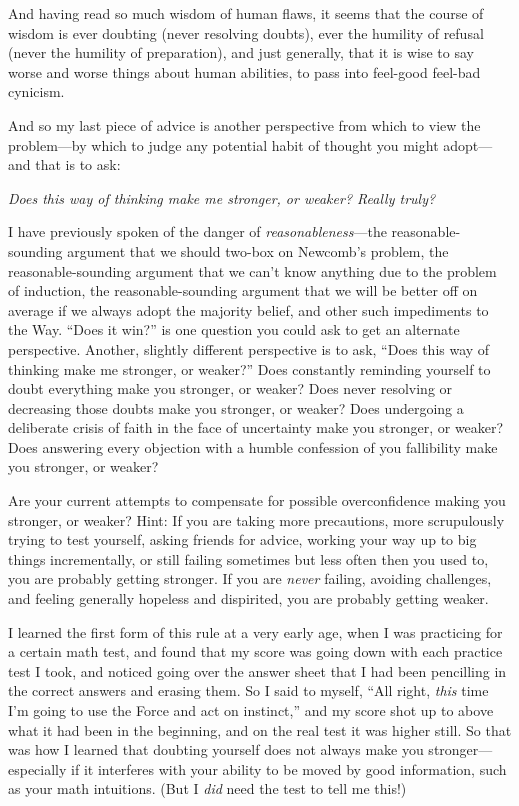 {
 And having read so much wisdom of human flaws, it seems that the
course of wisdom is ever doubting (never resolving doubts), ever the
humility of refusal (never the humility of preparation), and just
generally, that it is wise to say worse and worse things about human
abilities, to pass into feel-good feel-bad cynicism.}

{
 And so my last piece of advice is another perspective from which
to view the problem---by which to judge any potential habit of thought
you might adopt---and that is to ask:}

{
 \textit{Does this way of thinking make me stronger, or weaker?
Really truly?}}

{
 I have previously spoken of the danger of
\textit{reasonableness}{}---the reasonable-sounding argument that we
should two-box on Newcomb's problem, the
reasonable-sounding argument that we can't know
anything due to the problem of induction, the reasonable-sounding
argument that we will be better off on average if we always adopt the
majority belief, and other such impediments to the Way.
``Does it win?'' is one question you
could ask to get an alternate perspective. Another, slightly different
perspective is to ask, ``Does this way of thinking
make me stronger, or weaker?'' Does constantly
reminding yourself to doubt everything make you stronger, or weaker?
Does never resolving or decreasing those doubts make you stronger, or
weaker? Does undergoing a deliberate crisis of faith in the face of
uncertainty make you stronger, or weaker? Does answering every
objection with a humble confession of you fallibility make you
stronger, or weaker?}

{
 Are your current attempts to compensate for possible
overconfidence making you stronger, or weaker? Hint: If you are taking
more precautions, more scrupulously trying to test yourself, asking
friends for advice, working your way up to big things incrementally, or
still failing sometimes but less often then you used to, you are
probably getting stronger. If you are \textit{never} failing, avoiding
challenges, and feeling generally hopeless and dispirited, you are
probably getting weaker.}

{
 I learned the first form of this rule at a very early age, when I
was practicing for a certain math test, and found that my score was
going down with each practice test I took, and noticed going over the
answer sheet that I had been pencilling in the correct answers and
erasing them. So I said to myself, ``All right,
\textit{this} time I'm going to use the Force and act
on instinct,'' and my score shot up to above what it
had been in the beginning, and on the real test it was higher still. So
that was how I learned that doubting yourself does not always make you
stronger---especially if it interferes with your ability to be moved by
good information, such as your math intuitions. (But I \textit{did}
need the test to tell me this!)}

